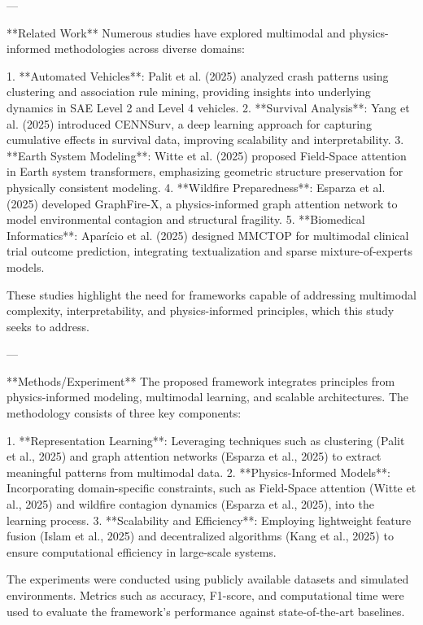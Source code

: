 ---

**Related Work**  
Numerous studies have explored multimodal and physics-informed methodologies across diverse domains:  

1. **Automated Vehicles**: Palit et al. (2025) analyzed crash patterns using clustering and association rule mining, providing insights into underlying dynamics in SAE Level 2 and Level 4 vehicles.  
2. **Survival Analysis**: Yang et al. (2025) introduced CENNSurv, a deep learning approach for capturing cumulative effects in survival data, improving scalability and interpretability.  
3. **Earth System Modeling**: Witte et al. (2025) proposed Field-Space attention in Earth system transformers, emphasizing geometric structure preservation for physically consistent modeling.  
4. **Wildfire Preparedness**: Esparza et al. (2025) developed GraphFire-X, a physics-informed graph attention network to model environmental contagion and structural fragility.  
5. **Biomedical Informatics**: Aparício et al. (2025) designed MMCTOP for multimodal clinical trial outcome prediction, integrating textualization and sparse mixture-of-experts models.  

These studies highlight the need for frameworks capable of addressing multimodal complexity, interpretability, and physics-informed principles, which this study seeks to address.

---

**Methods/Experiment**  
The proposed framework integrates principles from physics-informed modeling, multimodal learning, and scalable architectures. The methodology consists of three key components:  

1. **Representation Learning**: Leveraging techniques such as clustering (Palit et al., 2025) and graph attention networks (Esparza et al., 2025) to extract meaningful patterns from multimodal data.  
2. **Physics-Informed Models**: Incorporating domain-specific constraints, such as Field-Space attention (Witte et al., 2025) and wildfire contagion dynamics (Esparza et al., 2025), into the learning process.  
3. **Scalability and Efficiency**: Employing lightweight feature fusion (Islam et al., 2025) and decentralized algorithms (Kang et al., 2025) to ensure computational efficiency in large-scale systems.  

The experiments were conducted using publicly available datasets and simulated environments. Metrics such as accuracy, F1-score, and computational time were used to evaluate the framework's performance against state-of-the-art baselines.

